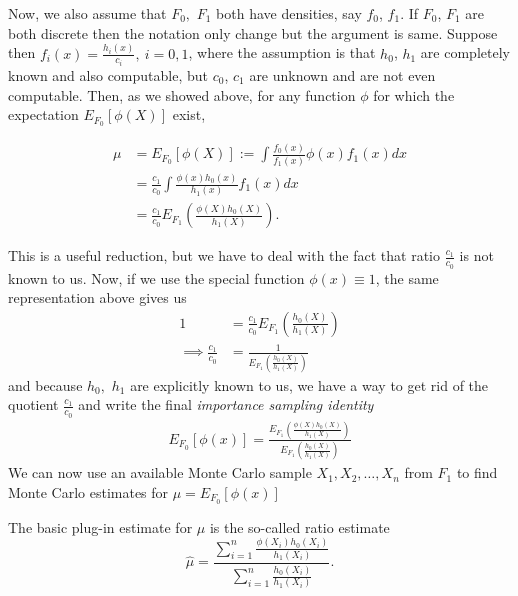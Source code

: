 Now, we also assume that $F_0,$ $F_1$ both have densities, say $f_0$, $f_1$.
If $F_0$, $F_1$ are both discrete then the notation only change but the argument is same.
Suppose then $f_i(x)=\frac{h_i(x)}{c_i},\ i=0,1$, where the assumption is that $h_0$, $h_1$
are completely known and also computable, but $c_0$, $c_1$ are unknown and are not even computable.
Then, as we showed above, for any function $\phi$ for which the expectation $E_{F_0}[\phi(X)]$ exist,

\begin{align*}
	\mu & = E_{F_0}[\phi(X)] := \int \frac{f_0(x)}{f_1(x)}\phi(x)f_1(x)dx      \\
	    & =\frac{c_1}{c_0} \int \frac{\phi(x)h_0(x)}{h_1(x)}f_1(x)dx           \\
	    & =\frac{c_1}{c_0} E_{F_1}\left( \frac{\phi(X)h_0(X)}{h_1(X)} \right).
\end{align*}

This is a useful reduction, but we have to deal with the fact that ratio $\frac{c_1}{c_0}$
is not known to us. Now, if we use the special function $\phi(x)\equiv 1$, the same
representation above gives us
\begin{align*}
	1                        & = \frac{c_1}{c_0} E_{F_1} \left( \frac{h_0(X)}{h_1(X)} \right) \\
	\implies \frac{c_1}{c_0} & = \frac{1}{E_{F_1} \left( \frac{h_0(X)}{h_1(X)} \right)}
\end{align*}
and because $h_0,$ $h_1$ are explicitly known to us, we have a way to get rid of the
quotient $\frac{c_1}{c_0}$ and write the final \textit{importance sampling identity}
\begin{align*}
	E_{F_0}[\phi(x)] = \frac{E_{F_1}\left( \frac{\phi(X)h_0(X)}{h_1(X)} \right)}{E_{F_1} \left( \frac{h_0(X)}{h_1(X)} \right)}
\end{align*}
We can now use an available Monte Carlo sample $X_1,X_2,\ldots,X_n$ from $F_1$
to find Monte Carlo estimates for $\mu = E_{F_0}[\phi(x)]$

The basic plug-in estimate for $\mu$ is the so-called ratio estimate
\[
	\hat{\mu} = \frac{\sum_{i = 1}^{n}\frac{\phi(X_i)h_0(X_i)}{h_1(X_i)} }{\sum_{i = 1}^{n} \frac{h_0(X_i)}{h_1(X_i)}}.
\]

